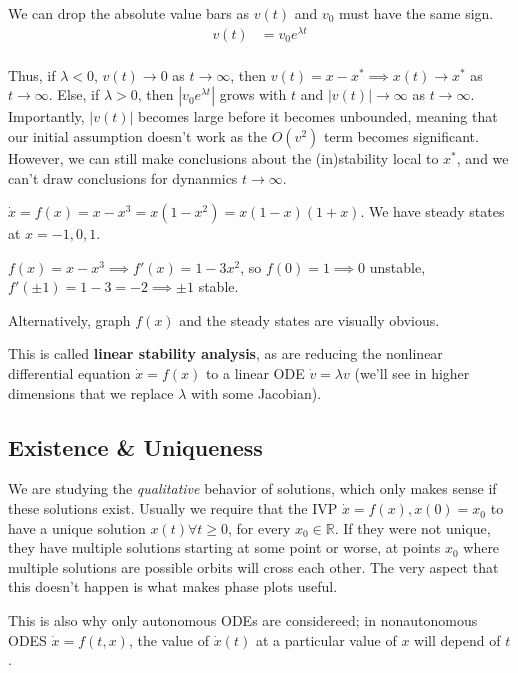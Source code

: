 \documentclass[12pt]{article}
\begin{document}
We can drop the absolute value bars as $v(t)$ and $v_0$ must have the same sign.
\begin{align*}
  v(t) &= v_0 e^{\lambda t}\\
\end{align*}

Thus, if $\lambda < 0$, $v(t) \to 0$ as $t \to \infty$, then $v(t) = x - x^* \implies x(t) \to x^*$ as $t \to \infty$. Else, if $\lambda > 0$, then $|v_0 e^{\lambda t}|$ grows with $t$ and $|v(t)| \to \infty$ as $t \to \infty$. Importantly, $|v(t)|$ becomes large before it becomes unbounded, meaning that our initial assumption doesn't work as the $O(v^2)$ term becomes significant. However, we can still make conclusions about the (in)stability local to $x^*$, and we can't draw conclusions for dynanmics $t \to \infty$.

\begin{example}
  $\dot{x} = f(x) = x-x^3 = x(1-x^2) = x(1-x)(1+x)$. We have steady states at $x = -1,0,1$.

  $f(x) = x - x^3 \implies f'(x) = 1 - 3x^2$, so $f(0) = 1 \implies 0$ unstable, $f'(\pm 1) = 1 -3 = -2 \implies \pm 1$ stable.

  Alternatively, graph $f(x)$ and the steady states are visually obvious.
\end{example}

This is called \textbf{linear stability analysis}, as are reducing the nonlinear differential equation $\dot{x} = f(x)$ to a linear ODE $\dot{v} = \lambda v$ (we'll see in higher dimensions that we replace $\lambda$ with some Jacobian).

\subsection{Existence \& Uniqueness}

We are studying the \textit{qualitative} behavior of solutions, which only makes sense if these solutions exist. Usually we require that the IVP $\dot{x} = f(x), x(0) = x_0$ to have a unique solution $x(t) \forall t \geq 0$, for every $x_0 \in \mathbb{R}$. If they were not unique, they have multiple solutions starting at some point or worse, at points $x_0$ where multiple solutions are possible orbits will cross each other. The very aspect that this doesn't happen is what makes phase plots useful.

This is also why only autonomous ODEs are considereed; in nonautonomous ODES $\dot{x} = f(t,x)$, the value of $\dot{x}(t)$ at a particular value of $x$ will depend of $t$.


\end{document}
